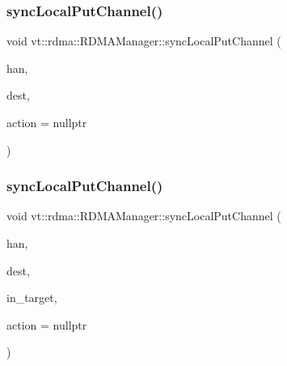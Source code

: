 \subsubsection{\texorpdfstring{sync\+Local\+Put\+Channel()}{syncLocalPutChannel()}\hspace{0.1cm}{\footnotesize\ttfamily [1/2]}}
{\footnotesize\ttfamily void vt\+::rdma\+::\+R\+D\+M\+A\+Manager\+::sync\+Local\+Put\+Channel (\begin{DoxyParamCaption}\item[{\hyperlink{namespacevt_a10442579ec4e7ebef223818e64bcf908}{R\+D\+M\+A\+\_\+\+Handle\+Type} const \&}]{han,  }\item[{\hyperlink{namespacevt_a866da9d0efc19c0a1ce79e9e492f47e2}{Node\+Type} const \&}]{dest,  }\item[{\hyperlink{namespacevt_ae0a5a7b18cc99d7b732cb4d44f46b0f3}{Action\+Type} const \&}]{action = {\ttfamily nullptr} }\end{DoxyParamCaption})\hspace{0.3cm}{\ttfamily [inline]}}

\mbox{\label{structvt_1_1rdma_1_1_r_d_m_a_manager_a3b4e56f84f35786f8225baffeaa921ea}} 
\subsubsection{\texorpdfstring{sync\+Local\+Put\+Channel()}{syncLocalPutChannel()}\hspace{0.1cm}{\footnotesize\ttfamily [2/2]}}
{\footnotesize\ttfamily void vt\+::rdma\+::\+R\+D\+M\+A\+Manager\+::sync\+Local\+Put\+Channel (\begin{DoxyParamCaption}\item[{\hyperlink{namespacevt_a10442579ec4e7ebef223818e64bcf908}{R\+D\+M\+A\+\_\+\+Handle\+Type} const \&}]{han,  }\item[{\hyperlink{namespacevt_a866da9d0efc19c0a1ce79e9e492f47e2}{Node\+Type} const \&}]{dest,  }\item[{\hyperlink{namespacevt_a866da9d0efc19c0a1ce79e9e492f47e2}{Node\+Type} const \&}]{in\+\_\+target,  }\item[{\hyperlink{namespacevt_ae0a5a7b18cc99d7b732cb4d44f46b0f3}{Action\+Type} const \&}]{action = {\ttfamily nullptr} }\end{DoxyParamCaption})\hspace{0.3cm}{\ttfamily [inline]}}

